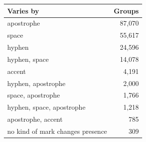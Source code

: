 \begin{tabular}{lr}
\toprule
Varies by & Groups \\
\midrule
apostrophe & 87,070 \\
space & 55,617 \\
hyphen & 24,596 \\
hyphen, space & 14,078 \\
accent & 4,191 \\
hyphen, apostrophe & 2,000 \\
space, apostrophe & 1,766 \\
hyphen, space, apostrophe & 1,218 \\
apostrophe, accent & 785 \\
no kind of mark changes presence & 309 \\
\bottomrule
\end{tabular}
